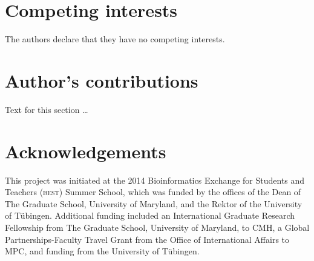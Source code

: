 \documentclass{bmcart}
\begin{document}
\begin{backmatter}

\section*{Competing interests}
  The authors declare that they have no competing interests.

\section*{Author's contributions}
    Text for this section \ldots

\section*{Acknowledgements}
This project was initiated at the 2014 Bioinformatics Exchange for
Students and Teachers (\textsc{best}) Summer School, which was funded
by the offices of the Dean of The Graduate School, University of
Maryland, and the Rektor of the University of T\"{u}bingen. Additional
funding included an International Graduate Research Fellowship from
The Graduate School, University of Maryland, to CMH, a Global
Partnerships-Faculty Travel Grant from the Office of International
Affairs to MPC, and funding from the University of T\"{u}bingen.




\end{backmatter}
\end{document}
